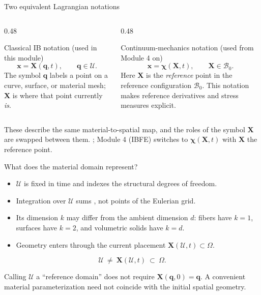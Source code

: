 \documentclass[aspectratio=169,11pt]{beamer}
\newcommand{\xvec}{\bm{x}}
\newcommand{\Xvec}{\bm{q}}
\newcommand{\chivec}{\bm{X}}
\begin{document}
\begin{frame}{Two equivalent Lagrangian notations}
\begin{columns}[T,onlytextwidth]
  \begin{column}{0.48\textwidth}
  \begin{block}{Classical IB notation (used in this module)}
  \[
    \xvec=\bm{X}(\bm q,t),
    \qquad \bm q\in\mathcal U .
  \]
  The symbol \(\bm q\) labels a point on a curve, surface, or material mesh; \(\bm X\) is where that point currently \emph{is}.
  \end{block}
  \end{column}
  \begin{column}{0.48\textwidth}
  \begin{block}{Continuum-mechanics notation (used from Module 4 on)}
  \[
    \xvec=\bm{\chi}(\bm{X},t),
    \qquad \bm{X}\in\mathcal B_0 .
  \]
  Here \(\bm X\) is the \emph{reference} point in the reference configuration \(\mathcal B_0\). This notation makes reference derivatives and stress measures explicit.
  \end{block}
  \end{column}
\end{columns}

\medskip
\begin{punchbox}
These describe the same material-to-spatial map, and the roles of the symbol \(\bm X\) are swapped between them. ; Module 4 (IBFE) switches to \(\bm\chi(\bm X,t)\) with \(\bm X\) the reference point.
\end{punchbox}
\end{frame}

\begin{frame}{What does the material domain represent?}
\begin{itemize}\itemsep7pt
  \item \(\mathcal U\) is fixed in time and indexes the structural degrees of freedom.
  \item Integration over \(\mathcal U\) sums , not points of the Eulerian grid.
  \item Its dimension \(k\) may differ from the ambient dimension \(d\): fibers have \(k=1\), surfaces have \(k=2\), and volumetric solids have \(k=d\).
  \item Geometry enters through the current placement \(\chivec(\mathcal U,t)\subset\Omega\).
\end{itemize}

\[
  \boxed{\mathcal U\ \neq\ \chivec(\mathcal U,t)\ \subset\ \Omega .}
\]

\begin{punchbox}
Calling \(\mathcal U\) a ``reference domain'' does not require \(\chivec(\Xvec,0)=\Xvec\). A convenient material parameterization need not coincide with the initial spatial geometry.
\end{punchbox}
\end{frame}
\end{document}
